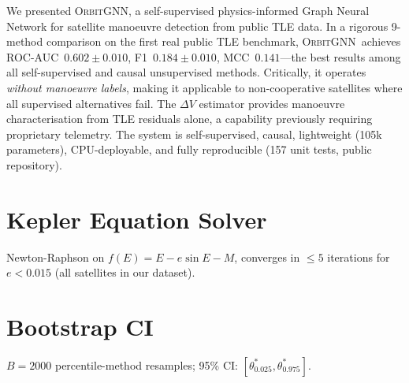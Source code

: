 \documentclass[journal]{IEEEtran}
\newcommand{\orbitgnn}{\textsc{OrbitGNN}}
\begin{document}
We presented \orbitgnn, a self-supervised physics-informed Graph Neural Network
for satellite manoeuvre detection from public TLE data. In a rigorous 9-method
comparison on the first real public TLE benchmark, \orbitgnn\ achieves
ROC-AUC~$0.602\pm0.010$, F1~$0.184\pm0.010$, MCC~$0.141$---the best results
among all self-supervised and causal unsupervised methods. Critically, it
operates \emph{without manoeuvre labels}, making it applicable to non-cooperative
satellites where all supervised alternatives fail. The $\Delta V$ estimator
provides manoeuvre characterisation from TLE residuals alone, a capability
previously requiring proprietary telemetry. The system is self-supervised,
causal, lightweight (105k parameters), CPU-deployable, and fully reproducible
(157 unit tests, public repository).

\appendix
\section{Kepler Equation Solver}
Newton-Raphson on $f(E)=E-e\sin E-M$, converges in $\le5$ iterations
for $e<0.015$ (all satellites in our dataset).

\section{Bootstrap CI}
$B=2000$ percentile-method resamples; 95\% CI: $[\theta^*_{0.025},\theta^*_{0.975}]$.
\end{document}

